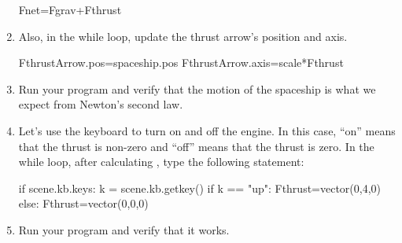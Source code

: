 \begin{enumerate}
\begin{myvpython}
        Fnet=Fgrav+Fthrust
\end{myvpython}

\item Also, in the while loop, update the thrust arrow's position and axis.

\begin{myvpython}
        FthrustArrow.pos=spaceship.pos
        FthrustArrow.axis=scale*Fthrust
\end{myvpython}

\item Run your program and verify that the motion of the spaceship is what we expect from Newton's second law. 


\item Let's use the keyboard to turn on and off the engine. In this case, ``on'' means that the thrust is non-zero and ``off'' means that the thrust is zero. In the while loop, after calculating , type the following  statement:
 
\begin{myvpython}
        if scene.kb.keys:
            k = scene.kb.getkey()
            if k == "up":
                Fthrust=vector(0,4,0)
            else:
                Fthrust=vector(0,0,0)
\end{myvpython}

        
\item Run your program and verify that it works.

\end{enumerate}

\pagebreak

\analysis

